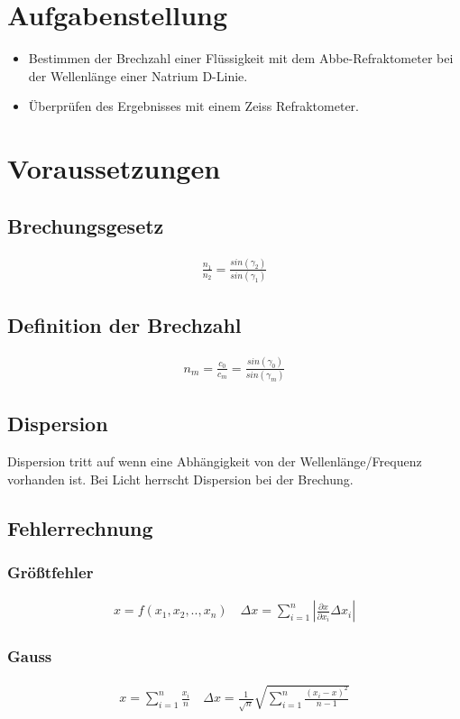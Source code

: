 \documentclass[a4paper]{article}
\begin{document}
\section{Aufgabenstellung}
\begin{itemize}
  \item Bestimmen der Brechzahl einer Flüssigkeit mit dem Abbe-Refraktometer bei der Wellenlänge einer Natrium D-Linie.
  \item Überprüfen des Ergebnisses mit einem Zeiss Refraktometer.
\end{itemize}

\section{Voraussetzungen}
\subsection{Brechungsgesetz}
\begin{align}
  \frac{n_1}{n_2}=\frac{sin(\gamma_2)}{sin(\gamma_1)}
  \label{bechungsgesetz}
\end{align}
\subsection{Definition der Brechzahl}
\begin{align}
  n_m = \frac{c_0}{c_m}=\frac{sin(\gamma_0)}{sin(\gamma_m)}
  \label{brechzahl}
\end{align}
\subsection{Dispersion}
Dispersion tritt auf wenn eine Abhängigkeit von der Wellenlänge/Frequenz vorhanden ist. Bei Licht herrscht Dispersion bei der Brechung.
\subsection{Fehlerrechnung}
\subsubsection{Größtfehler} 
\begin{align}
  x=f(x_1,x_2,..,x_n) \quad
  \Delta x = \sum_{i=1}^n{\left |\frac{\partial  x}{\partial x_i}\Delta x_i\right |}
  \label{error}
\end{align}
\subsubsection{Gauss}
\begin{align}
  x = \sum_{i=1}^n{\frac{x_i}{n}} \quad
  \Delta x = \frac{1}{\sqrt{n}}\sqrt{\sum_{i=1}^n{\frac{(x_i-x)^2}{n-1}}}
\end{align}
\newpage
\end{document}
